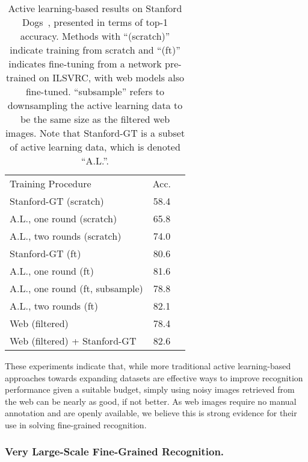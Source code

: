 \documentclass[runningheads]{llncs}
\begin{document}
\begin{SCtable}[][t]
\centering
\begin{tabular}{|l|c|r|}
\hline
Training Procedure & Acc. \\
\hhline{|=|=|}
Stanford-GT (scratch)                      & 58.4 \\ \hline
A.L., one round (scratch)                        & 65.8 \\ \hline
A.L., two rounds (scratch)                        & 74.0 \\ \hline
Stanford-GT (ft)                               & 80.6 \\ \hline
A.L., one round (ft)                          & 81.6 \\ \hline
A.L., one round (ft, subsample)                          & 78.8 \\ \hline
A.L., two rounds (ft)                          & 82.1 \\ \hline
Web (filtered)                                   & 78.4 \\ \hline
Web (filtered) + Stanford-GT                           & 82.6  \\
\hline
\end{tabular}
\caption{
Active learning-based results on Stanford Dogs~\cite{khosla2011novel}, presented in terms of top-1 accuracy.
Methods with ``(scratch)'' indicate training from scratch and ``(ft)'' indicates fine-tuning from a network pre-trained on ILSVRC, with web models also fine-tuned.
``subsample'' refers to downsampling the active learning data to be the same size as the filtered web images.
Note that Stanford-GT is a subset of active learning data, which is denoted ``A.L.''.
}
\label{tab:al-results}
\end{SCtable}


These experiments indicate that, while more traditional active learning-based approaches towards expanding datasets are effective ways to improve recognition performance given a suitable budget, simply using noisy images retrieved from the web can be nearly as good, if not better.
As web images require no manual annotation and are openly available, we believe this is strong evidence for their use in solving fine-grained recognition.



\subsubsection{Very Large-Scale Fine-Grained Recognition.}
\end{document}
